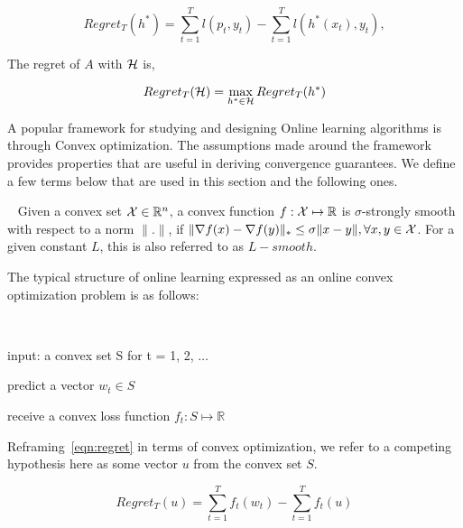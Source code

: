 \begin{equation}
	\label{eqn:regret}
	Regret_T(h^*) = \sum_{t=1}^T l(p_t, y_t) - \sum_{t=1}^T l(h^*(x_t), y_t),
\end{equation}

The regret of $A$ with $\mathcal{H}$ is,

\begin{equation}
	\label{eqn:regret_all} Regret_T(\mathcal{H}) = \max_{h^* \in \mathcal{H}} Regret_T(h^*)
\end{equation}

A popular framework for studying and designing Online learning algorithms is
through Convex optimization.
The assumptions made around the framework provides properties that are useful in deriving
convergence guarantees.
We define a few terms below that are used in this section and the following ones.


\begin{definition}~\label{def:strsmooth}
	Given a convex set $\mathcal{X} \in \mathbb{R}^n$, a convex function $f: \mathcal{X} \mapsto \mathbb{R}$ is $\sigma$-strongly
	smooth with respect to a norm $\|.
		\|$, if $\|\nabla f(x) - \nabla f(y) \|_{\ast} \leq \sigma \|x - y \|, \forall x, y \in \mathcal{X}$.
	For a given constant $L$, this is also referred to as $L-smooth$.
\end{definition}



The typical structure of online learning expressed as an online convex optimization problem is as
follows:

\begin{alprocedure}[H] ~\label{alg:oco}

	input: a convex set S for t = 1, 2, $\ldots$

	predict a
	vector $w_t \in S$

	receive a convex loss function $f_t: S \mapsto \mathbb{R}$
\end{alprocedure}

Reframing~\ref{eqn:regret} in terms of convex optimization,
we refer to a competing hypothesis here as some vector $u$ from the convex set $S$.

\begin{equation}
	Regret_T(u) = \sum_{t=1}^T f_t(w_t) - \sum_{t=1}^T f_t(u)
\end{equation}

